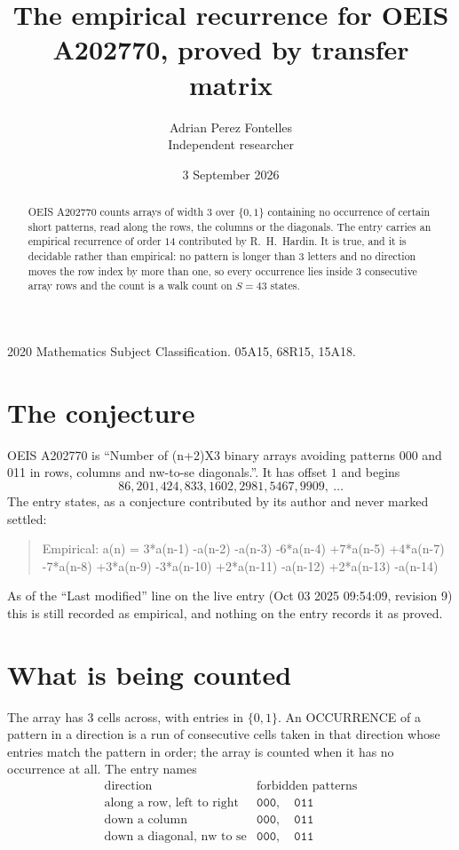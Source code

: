 \documentclass[11pt,a4paper]{article}
\title{The empirical recurrence for OEIS A202770, proved by transfer matrix}
\author{Adrian Perez Fontelles\\ \small Independent researcher}
\date{3 September 2026}
\theoremstyle{plain}
\theoremstyle{definition}
\begin{document}
\maketitle

\begin{abstract}
OEIS A202770 counts arrays of width $3$ over $\{0,1\}$ containing no occurrence of certain short
patterns, read along the rows, the columns or the diagonals. The entry carries an empirical
recurrence of order $14$ contributed by R.~H.~Hardin. It is true, and it is decidable
rather than empirical: no pattern is longer than $3$ letters and no direction moves the row
index by more than one, so every occurrence lies inside $3$ consecutive array rows and the
count is a walk count on $S=43$ states.
\end{abstract}

\noindent\small 2020 Mathematics Subject Classification. 05A15, 68R15, 15A18.\normalsize

\section{The conjecture}

OEIS A202770 is ``Number of (n+2)X3 binary arrays avoiding patterns 000 and 011 in rows, columns and nw-to-se diagonals.''. It has offset $1$ and begins
\[
86, 201, 424, 833, 1602, 2981, 5467, 9909,\ \dots
\]
The entry states, as a conjecture contributed by its author and never marked settled:
\begin{quote}
Empirical: a(n) = 3*a(n-1) -a(n-2) -a(n-3) -6*a(n-4) +7*a(n-5) +4*a(n-7) -7*a(n-8) +3*a(n-9) -3*a(n-10) +2*a(n-11) -a(n-12) +2*a(n-13) -a(n-14)
\end{quote}
As of the ``Last modified'' line on the live entry (Oct 03 2025 09:54:09, revision 9) this is still
recorded as empirical, and nothing on the entry records it as proved.

\section{What is being counted}

The array has $3$ cells across, with entries in $\{0,1\}$. An OCCURRENCE of a pattern in a
direction is a run of consecutive cells taken in that direction whose entries match the pattern
in order; the array is counted when it has no occurrence at all. The entry names
\[
\begin{array}{ll}
\text{direction} & \text{forbidden patterns} \\[2pt]
\text{along a row, left to right} & \mathtt{000},\quad \mathtt{011} \\
\text{down a column} & \mathtt{000},\quad \mathtt{011} \\
\text{down a diagonal, nw to se} & \mathtt{000},\quad \mathtt{011} \\
\end{array}
\]
\end{document}
